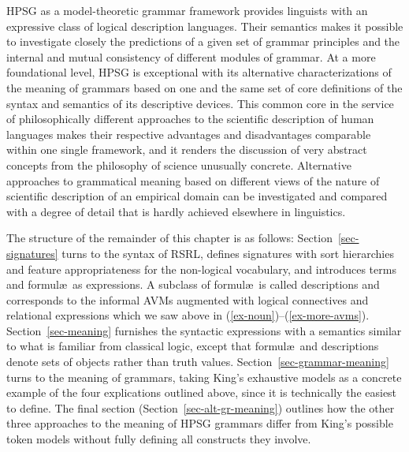 \documentclass[output=paper
                ,modfonts
                ,nonflat
	        ,collection
	        ,collectionchapter
	        ,collectiontoclongg
 	        ,biblatex
                ,babelshorthands
                ,newtxmath
                ,draftmode
                ,colorlinks, citecolor=brown
]{./langsci/langscibook}
\begin{document}
{{HPSG as a model-theoretic grammar framework provides linguists with an
expressive class of logical description languages. Their semantics
makes it possible to investigate closely the predictions of a given
set of grammar principles and the internal and mutual consistency
of different modules of grammar. At a more foundational level, HPSG is
exceptional with its alternative characterizations of the meaning of
grammars based on one and the same set of core definitions of the
syntax and semantics of its descriptive devices. This common core in
the service of
philosophically different approaches to the scientific description of
human languages makes their respective advantages and disadvantages
comparable within one single framework, and it renders the discussion
of very abstract concepts from the philosophy of science unusually concrete.  Alternative approaches
to grammatical meaning based on different views of the nature of
scientific description of an empirical domain can be investigated and
compared with a degree of detail that is hardly achieved elsewhere in
linguistics.




The structure of the remainder of this chapter is as follows:
Section~\ref{sec-signatures} turns to the syntax of RSRL, defines
signatures with sort hierarchies and feature appropriateness for the
non-logical vocabulary, and introduces terms and formul\ae\ as
expressions. A subclass of formul\ae\ is called
descriptions and corresponds to the informal
AVMs augmented with logical connectives and relational
expressions which we saw above in (\ref{ex-noun})--(\ref{ex-more-avms}). Section~\ref{sec-meaning} furnishes the syntactic expressions
with a semantics similar to what is familiar from classical logic,
except that formul\ae\ and descriptions denote sets of objects rather than truth
values. Section~\ref{sec-grammar-meaning} turns to the meaning of
grammars, taking King's exhaustive models as a concrete example of the
four explications outlined above, since it is technically the easiest
to define.  The final section (Section~\ref{sec-alt-gr-meaning})
outlines how the other three approaches to the meaning of HPSG grammars
differ from King's possible token models without fully defining all constructs
they involve.

}}
\end{document}
